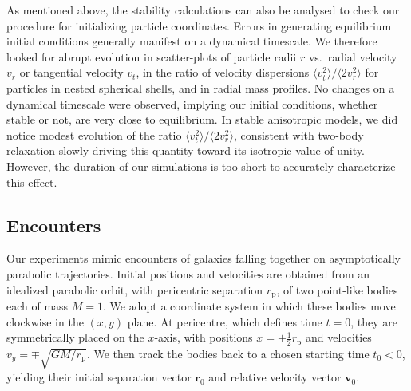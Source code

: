 \documentclass[fleqn,usenatbib]{mnras}
\begin{document}
As mentioned above, the stability calculations can also be analysed to check our procedure for initializing particle coordinates. Errors in generating equilibrium initial conditions generally manifest on a dynamical timescale. We therefore looked for abrupt evolution in scatter-plots of particle radii $r$ vs.~radial velocity $v_r$ or tangential velocity $v_t$, in the ratio of velocity dispersions $\langle v_t^2 \rangle / \langle 2 v_r^2 \rangle$ for particles in nested spherical shells, and in radial mass profiles. No changes on a dynamical timescale were observed, implying our initial conditions, whether stable or not, are very close to equilibrium. In stable anisotropic models, we did notice modest evolution of the ratio $\langle v_t^2 \rangle / \langle 2 v_r^2 \rangle$, consistent with two-body relaxation slowly driving this quantity toward its isotropic value of unity. However, the duration of our simulations is too short to accurately characterize this effect.

\subsection{Encounters}
\label{sec:Encounters}

\newcommand{\texthalf}{\textstyle\frac{1}{2}}

Our experiments mimic encounters of galaxies falling together on asymptotically parabolic trajectories. Initial positions and velocities are obtained from an idealized parabolic orbit, with pericentric separation $r_\mathrm{p}$, of two point-like bodies each of mass $M = 1$. We adopt a coordinate system in which these bodies move clockwise in the $(x,y)$ plane. At pericentre, which defines time $t = 0$, they are symmetrically placed on the $x$-axis, with positions $x = \pm \texthalf r_\mathrm{p}$ and velocities $v_y = \mp \sqrt{G M / r_\mathrm{p}}$. We then track the bodies back to a chosen starting time $t_{0} < 0$, yielding their initial separation vector $\mathbf{r}_{0}$ and relative velocity vector $\mathbf{v}_{0}$.
\end{document}
